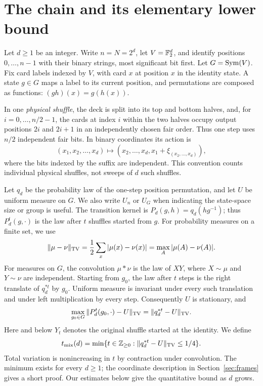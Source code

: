 \section{The chain and its elementary lower bound}\label{sec:prelim}

Let $d\ge1$ be an integer. Write $n=N=2^d$, let $V=\mathbb F_2^d$, and identify positions $0,\ldots,n-1$
with their binary strings, most significant bit first. Let $G=\operatorname{Sym}(V)$.
Fix card labels indexed by $V$, with card $x$ at position $x$ in
the identity state. A state $g\in G$ maps a label to its current
position, and permutations are composed as functions:
$(gh)(x)=g(h(x))$.

In one \emph{physical shuffle}, the deck is split into its top and bottom
halves, and, for $i=0,\ldots,n/2-1$, the cards at index $i$ within the
two halves occupy output positions
$2i$ and $2i+1$ in an independently chosen fair order. Thus one step
uses $n/2$ independent fair bits. In binary coordinates its action is
\begin{equation}\label{eq:physical-step}
 (x_1,x_2,\ldots,x_d)\longmapsto
 (x_2,\ldots,x_d,x_1+\xi_{(x_2,\ldots,x_d)}),
\end{equation}
where the bits indexed by the suffix are independent. This convention
counts individual physical shuffles, not sweeps of $d$ such shuffles.

Let $q_d$ be the probability law of the one-step position permutation,
and let $U$ be uniform measure on $G$. We also write $U_n$ or $U_G$
when indicating the state-space size or group is useful. The transition
kernel is $P_d(g,h)=q_d(hg^{-1})$; thus $P_d^t(g,\cdot)$ is the law
after $t$ shuffles started from $g$. For probability measures on a finite
set, we use
\[
 \|\mu-\nu\|_{\mathrm{TV}}
 =\frac12\sum_x|\mu(x)-\nu(x)|
 =\max_A|\mu(A)-\nu(A)|.
\]
For measures on $G$, the convolution $\mu*\nu$ is the law of $XY$, where
$X\sim\mu$ and $Y\sim\nu$ are independent. Starting from $g_0$, the law
after $t$ steps is the right translate of $q_d^{*t}$ by $g_0$.
Uniform measure is invariant under every such translation and under
left multiplication by every step. Consequently $U$ is stationary, and
\begin{equation}\label{eq:worst-state}
 \max_{g_0\in G}\|P_d^t(g_0,\cdot)-U\|_{\mathrm{TV}}
 =\|q_d^{*t}-U\|_{\mathrm{TV}}.
\end{equation}
Here and below $Y_t$ denotes the original shuffle started at the identity.
We define
\begin{equation}\label{eq:tmix}
 t_{\mathrm{mix}}(d)=
 \min\{t\in\mathbb Z_{\ge0}:\|q_d^{*t}-U\|_{\mathrm{TV}}\le1/4\}.
\end{equation}
Total variation is nonincreasing in $t$ by contraction under convolution.
The minimum exists for every $d\ge1$; the coordinate description in
Section~\ref{sec:frames} gives a short proof. Our estimates below give
the quantitative bound as $d$ grows.

